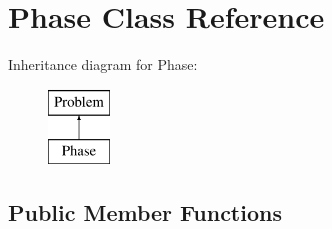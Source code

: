 \hypertarget{classPhase}{}\section{Phase Class Reference}
\label{classPhase}
Inheritance diagram for Phase\+:\begin{figure}[H]
\begin{center}
\leavevmode
\includegraphics[height=2.000000cm]{classPhase}
\end{center}
\end{figure}
\subsection*{Public Member Functions}
